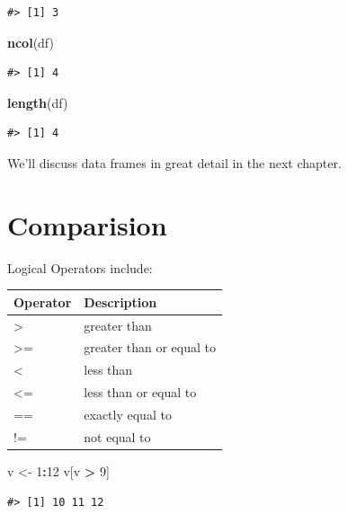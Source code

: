 \documentclass[]{book}
\newenvironment{Shaded}{\begin{snugshade}}{\end{snugshade}}
\newcommand{\KeywordTok}[1]{\textcolor[rgb]{0.13,0.29,0.53}{\textbf{#1}}}
\newcommand{\DecValTok}[1]{\textcolor[rgb]{0.00,0.00,0.81}{#1}}
\newcommand{\StringTok}[1]{\textcolor[rgb]{0.31,0.60,0.02}{#1}}
\newcommand{\OperatorTok}[1]{\textcolor[rgb]{0.81,0.36,0.00}{\textbf{#1}}}
\newcommand{\NormalTok}[1]{#1}
\theoremstyle{definition}
\theoremstyle{definition}
\theoremstyle{definition}
\theoremstyle{remark}
\begin{document}
\begin{verbatim}
#> [1] 3
\end{verbatim}

\begin{Shaded}
\begin{Highlighting}[]
\KeywordTok{ncol}\NormalTok{(df)}
\end{Highlighting}
\end{Shaded}

\begin{verbatim}
#> [1] 4
\end{verbatim}

\begin{Shaded}
\begin{Highlighting}[]
\KeywordTok{length}\NormalTok{(df)}
\end{Highlighting}
\end{Shaded}

\begin{verbatim}
#> [1] 4
\end{verbatim}

We'll discuss data frames in great detail in the next chapter.

\section{Comparision}\label{comparision}

Logical Operators include:

\begin{longtable}[]{@{}ll@{}}
\toprule
Operator & Description\tabularnewline
\midrule
\endhead
\textgreater{} & greater than\tabularnewline
\textgreater{}= & greater than or equal to\tabularnewline
\textless{} & less than\tabularnewline
\textless{}= & less than or equal to\tabularnewline
== & exactly equal to\tabularnewline
!= & not equal to\tabularnewline
\bottomrule
\end{longtable}

\begin{Shaded}
\begin{Highlighting}[]
\NormalTok{v <-}\StringTok{ }\DecValTok{1}\OperatorTok{:}\DecValTok{12}
\NormalTok{v[v }\OperatorTok{>}\StringTok{ }\DecValTok{9}\NormalTok{]}
\end{Highlighting}
\end{Shaded}

\begin{verbatim}
#> [1] 10 11 12
\end{verbatim}
\end{document}
